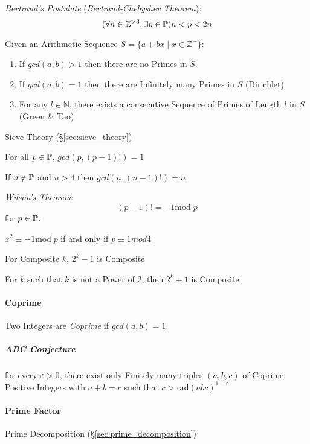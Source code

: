 \emph{Bertrand's Postulate} (\emph{Bertrand-Chebyshev Theorem}):
\[
  (\forall n \in \mathbb{Z}^{>3}, \exists p \in \mathbb{P}) n < p < 2n
\]

Given an Arithmetic Sequence $S = \{ a + bx \;|\; x \in \mathbb{Z}^+\}$:
\begin{enumerate}
  \item If $gcd(a,b) > 1$ then there are no Primes in $S$.
  \item If $gcd(a,b) = 1$ then there are Infinitely many Primes in $S$
    (Dirichlet)
  \item For any $l \in \mathbb{N}$, there exists a consecutive
    Sequence of Primes of Length $l$ in $S$ (Green \& Tao)
\end{enumerate}

Sieve Theory (\S\ref{sec:sieve_theory})

For all $p \in \mathbb{P}$, $gcd(p, (p-1)!) = 1$

If $n \notin \mathbb{P}$ and $n > 4$ then $gcd(n,(n-1)!) = n$

\emph{Wilson's Theorem}:
\[
  (p - 1)! = -1 \mathrm{mod}\;p
\]
for $p \in \mathbb{P}$.

$x^2 \equiv -1 \mathrm{mod}\;p$ if and only if $p \equiv 1 mod 4$

For Composite $k$, $2^k-1$ is Composite

For $k$ such that $k$ is not a Power of $2$, then $2^k+1$ is Composite



\paragraph{Coprime}\label{sec:coprime}\hfill

Two Integers are \emph{Coprime} if $gcd (a,b) = 1$.



\subparagraph{ABC Conjecture}\label{sec:abc_conjecture}\hfill

for every $\varepsilon > 0$, there exist only Finitely many triples $(a,b,c)$ of
Coprime Positive Integers with $a + b = c$ such that
$c > \mathrm{rad}(abc)^{1-\varepsilon}$



\paragraph{Prime Factor}\label{sec:prime_factor}\hfill

Prime Decomposition (\S\ref{sec:prime_decomposition})

